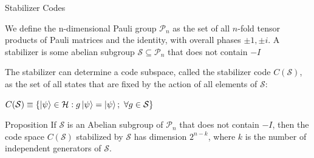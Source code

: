 \documentclass{beamer}
\begin{document}
\begin{frame}{Stabilizer Codes}
    \begin{definition}
        We define the n-dimensional Pauli group $\mathcal{P}_n$ as the set of all $n$-fold tensor products of Pauli matrices and the identity, with overall phases $\pm 1, \pm i$. A stabilizer is some abelian subgroup $ \mathcal{S} \subseteq \mathcal{P}_n$ that does not contain $-I$
    \end{definition}

The stabilizer can determine a code subspace, called the stabilizer code $C(\mathcal{S})$, as the set of all states that are fixed by the action of all elements of $\mathcal{S}$:
\begin{center}
    $C(\mathcal{S}) \equiv \{ \ket{\psi} \in \mathcal{H} : g \ket{\psi} = \ket{\psi}; \ \forall g \in \mathcal{S} \}$
\end{center}
\begin{alertblock}{Proposition}
If $\mathcal{S}$ is an Abelian subgroup of $\mathcal{P}_n$ that does not contain $-I$, then the code space $C(\mathcal{S})$ stabilized by $\mathcal{S}$ has dimension $2^{n - k}$, where $k$ is the number of independent generators of $\mathcal{S}$. \cite{Girvin2023}
\end{alertblock}
\end{frame}
\end{document}

